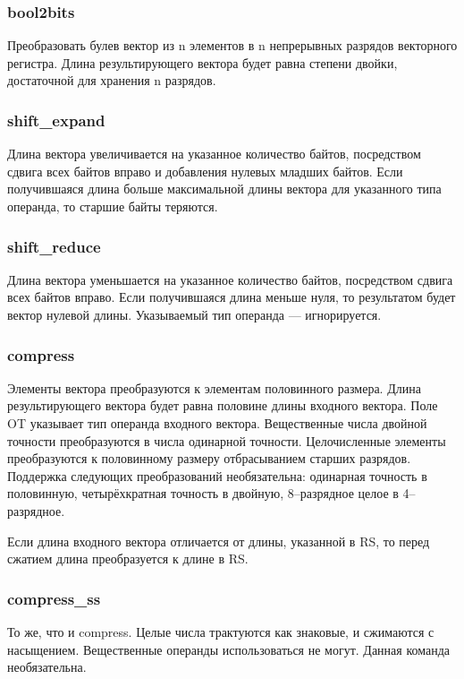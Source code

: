\documentclass[forwardcom.tex]{subfiles}
\begin{document}
\subsubsection{bool2bits}
Преобразовать булев вектор из n элементов в n непрерывных разрядов векторного регистра. Длина результирующего вектора будет равна степени двойки, достаточной для хранения n разрядов.

\subsubsection{shift\_expand}
Длина вектора увеличивается на указанное количество байтов, посредством сдвига всех байтов вправо и добавления нулевых младших байтов. Если получившаяся длина больше  максимальной длины вектора для указанного типа операнда, то старшие байты теряются.

\subsubsection{shift\_reduce}
Длина вектора уменьшается на указанное количество байтов, посредством сдвига всех байтов вправо. Если получившаяся длина меньше нуля, то результатом будет вектор нулевой длины. Указываемый тип операнда --- игнорируется.

\subsubsection{compress}
Элементы вектора преобразуются к элементам половинного размера. Длина результирующего вектора будет равна половине длины входного вектора. Поле OT указывает тип операнда входного вектора. Вещественные числа двойной точности преобразуются в числа одинарной точности. Целочисленные элементы преобразуются к половинному размеру отбрасыванием старших разрядов. Поддержка следующих преобразований необязательна: одинарная точность в половинную, четырёхкратная точность в двойную, 8--разрядное целое в 4--разрядное.

Если длина входного вектора отличается от длины, указанной в RS, то перед сжатием длина преобразуется к длине в RS.

\subsubsection{compress\_ss}
То же, что и compress. Целые числа трактуются как знаковые, и сжимаются с насыщением. Вещественные операнды использоваться не могут. Данная команда необязательна.
\end{document}
